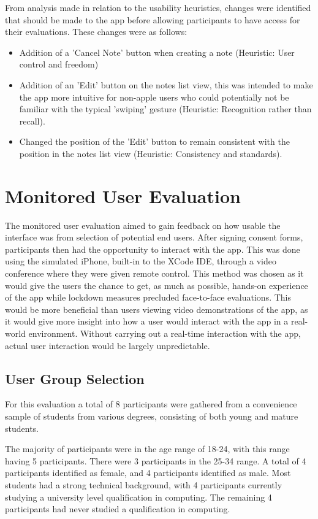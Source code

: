 \documentclass{l4proj}
\begin{document}
From analysis made in relation to the usability heuristics, changes were identified that should be made to the app before allowing participants to have access for their evaluations. These changes were as follows:
\begin{itemize}
    \item Addition of a 'Cancel Note' button when creating a note (Heuristic: User control and freedom)
    \item Addition of an 'Edit' button on the notes list view, this was intended to make the app more intuitive for non-apple users who could potentially not be familiar with the typical 'swiping' gesture (Heuristic: Recognition rather than recall).
    \item Changed the position of the 'Edit' button to remain consistent with the position in the notes list view (Heuristic: Consistency and standards).
\end{itemize}


\section{Monitored User Evaluation}

The monitored user evaluation aimed to gain feedback on how usable the interface was from selection of potential end users. After signing consent forms, participants then had the opportunity to interact with the app. This was done using the simulated iPhone, built-in to the XCode IDE, through a video conference where they were given remote control. This method was chosen as it would give the users the chance to get, as much as possible, hands-on experience of the app while lockdown measures precluded face-to-face evaluations. This would be more beneficial than users viewing video demonstrations of the app, as it would give more insight into how a user would interact with the app in a real-world environment. Without carrying out a real-time interaction with the app, actual user interaction would be largely unpredictable.

\subsection{User Group Selection}

For this evaluation a total of 8 participants were gathered from a convenience sample of students from various degrees, consisting of both young and mature students. 

The majority of participants were in the age range of 18-24, with this range having 5 participants. There were 3 participants in the 25-34 range. A total of 4 participants identified as female, and 4 participants identified as male. Most students had a strong technical background, with 4 participants currently studying a university level qualification in computing. The remaining 4 participants had never studied a qualification in computing.
\end{document}
